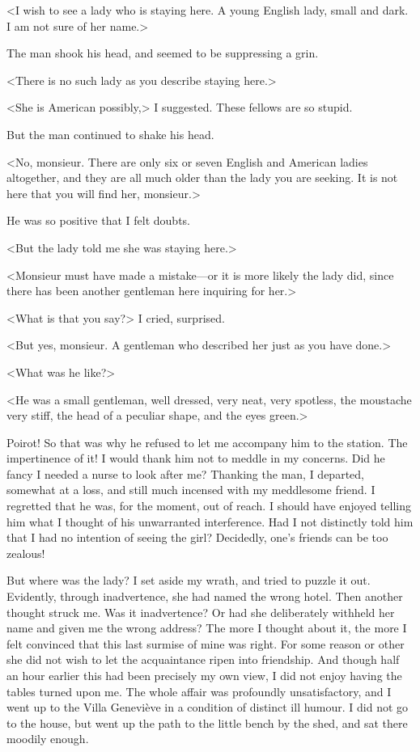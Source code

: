  <I wish to see a lady who is staying here. A young English lady, small and dark. I am not sure of her name.> 

 The man shook his head, and seemed to be suppressing a grin. 

 <There is no such lady as you describe staying here.> 

 <She is American possibly,> I suggested. These fellows are so stupid. 

 But the man continued to shake his head. 

 <No, monsieur. There are only six or seven English and American ladies altogether, and they are all much older than the lady you are seeking. It is not here that you will find her, monsieur.> 

 He was so positive that I felt doubts. 

 <But the lady told me she was staying here.> 

 <Monsieur must have made a mistake—or it is more likely the lady did, since there has been another gentleman here inquiring for her.> 

 <What is that you say?> I cried, surprised. 

 <But yes, monsieur. A gentleman who described her just as you have done.> 

 <What was he like?> 

 <He was a small gentleman, well dressed, very neat, very spotless, the moustache very stiff, the head of a peculiar shape, and the eyes green.> 

 Poirot! So that was why he refused to let me accompany him to the station. The impertinence of it! I would thank him not to meddle in my concerns. Did he fancy I needed a nurse to look after me? Thanking the man, I departed, somewhat at a loss, and still much incensed with my meddlesome friend. I regretted that he was, for the moment, out of reach. I should have enjoyed telling him what I thought of his unwarranted interference. Had I not distinctly told him that I had no intention of seeing the girl? Decidedly, one's friends can be too zealous! 

 But where was the lady? I set aside my wrath, and tried to puzzle it out. Evidently, through inadvertence, she had named the wrong hotel. Then another thought struck me. Was it inadvertence? Or had she deliberately withheld her name and given me the wrong address? The more I thought about it, the more I felt convinced that this last surmise of mine was right. For some reason or other she did not wish to let the acquaintance ripen into friendship. And though half an hour earlier this had been precisely my own view, I did not enjoy having the tables turned upon me. The whole affair was profoundly unsatisfactory, and I went up to the Villa Geneviève in a condition of distinct ill humour. I did not go to the house, but went up the path to the little bench by the shed, and sat there moodily enough. 

